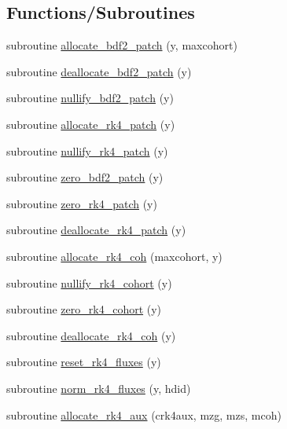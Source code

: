 \subsection*{Functions/\+Subroutines}
\begin{DoxyCompactItemize}
\item 
subroutine \hyperlink{namespacerk4__coms_a292fa2f7c65668f516015eff1a3b74e2}{allocate\+\_\+bdf2\+\_\+patch} (y, maxcohort)
\item 
subroutine \hyperlink{namespacerk4__coms_a38274254cb16401c20124f7620f64ab2}{deallocate\+\_\+bdf2\+\_\+patch} (y)
\item 
subroutine \hyperlink{namespacerk4__coms_a22f63b46db00ae302b1ae688abecc22d}{nullify\+\_\+bdf2\+\_\+patch} (y)
\item 
subroutine \hyperlink{namespacerk4__coms_a52256ca0348235c95a467581d6067dac}{allocate\+\_\+rk4\+\_\+patch} (y)
\item 
subroutine \hyperlink{namespacerk4__coms_a34a6a346af3d032c14f416435801598a}{nullify\+\_\+rk4\+\_\+patch} (y)
\item 
subroutine \hyperlink{namespacerk4__coms_a4dc0257365f3ec4614c2e41451517e28}{zero\+\_\+bdf2\+\_\+patch} (y)
\item 
subroutine \hyperlink{namespacerk4__coms_a4206f404f555c50ee6570211356bd537}{zero\+\_\+rk4\+\_\+patch} (y)
\item 
subroutine \hyperlink{namespacerk4__coms_ad2699a814198d0d9a0133d1eb579542c}{deallocate\+\_\+rk4\+\_\+patch} (y)
\item 
subroutine \hyperlink{namespacerk4__coms_ac355c3cf81ffef1c269338cf8b07c4bc}{allocate\+\_\+rk4\+\_\+coh} (maxcohort, y)
\item 
subroutine \hyperlink{namespacerk4__coms_afe54efd0ad9ab38983314ca0d2557e26}{nullify\+\_\+rk4\+\_\+cohort} (y)
\item 
subroutine \hyperlink{namespacerk4__coms_a1053434edb41147cb74257d6339eab8f}{zero\+\_\+rk4\+\_\+cohort} (y)
\item 
subroutine \hyperlink{namespacerk4__coms_a56a9eb1fd462e81374c5993b69d3d05c}{deallocate\+\_\+rk4\+\_\+coh} (y)
\item 
subroutine \hyperlink{namespacerk4__coms_a02aeb5f0e99479e6eef3029472a79781}{reset\+\_\+rk4\+\_\+fluxes} (y)
\item 
subroutine \hyperlink{namespacerk4__coms_ad9cf07917e6000f8f46e84428647b494}{norm\+\_\+rk4\+\_\+fluxes} (y, hdid)
\item 
subroutine \hyperlink{namespacerk4__coms_afe1de3958c4ca4c64d5fb2160fced95f}{allocate\+\_\+rk4\+\_\+aux} (crk4aux, mzg, mzs, mcoh)

\end{DoxyCompactItemize}
